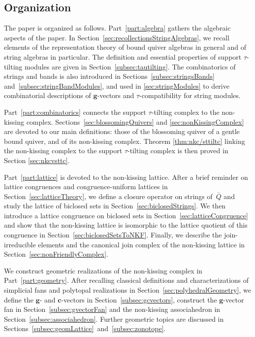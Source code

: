 \documentclass{amsart}
\theoremstyle{definition}
\renewcommand{\b}[1]{\mathbf{#1}} %
\begin{document}
\subsection*{Organization}

The paper is organized as follows.
Part~\ref{part:algebra} gathers the algebraic aspects of the paper.
In Section~\ref{sec:recollectionsStringAlgebras}, we recall elements of the representation theory of bound quiver algebras in general and of string algebras in particular.
The definition and essential properties of support \mbox{$\tau$-tilting} modules are given in Section~\ref{subsec:tautilting}.  
The combinatorics of strings and bands is also introduced in Sections~\ref{subsec:stringsBands} and~\ref{subsec:stringBandModules}, and used in \ref{sec:stringModules} to derive combinatorial descriptions of $\b{g}$-vectors and $\tau$-compatibility for string modules.

Part~\ref{part:combinatorics} connects the support $\tau$-tilting complex to the non-kissing complex.
Sections~\ref{sec:blossomingQuivers} and \ref{sec:nonKissingComplex} are devoted to our main definitions: those of the blossoming quiver of a gentle bound quiver, and of its non-kissing complex.  
Theorem \ref{thm:nkc/sttiltc} linking the non-kissing complex to the support $\tau$-tilting complex is then proved in Section \ref{sec:nkcvsttc}.

Part~\ref{part:lattice} is devoted to the non-kissing lattice.
After a brief reminder on lattice congruences and congruence-uniform lattices in Section~\ref{sec:latticeTheory}, we define a closure operator on strings of~$\bar Q$ and study the lattice of biclosed sets in Section~\ref{sec:biclosedStrings}.
We then introduce a lattice congruence on biclosed sets in Section~\ref{sec:latticeCongruence} and show that the non-kissing lattice is isomorphic to the lattice quotient of this congruence in Section~\ref{sec:biclosedSetsToNKF}.
Finally, we describe the join-irreducible elements and the canonical join complex of the non-kissing lattice in Section~\ref{sec:nonFriendlyComplex}.

We construct geometric realizations of the non-kissing complex in Part~\ref{part:geometry}.
After recalling classical definitions and characterizations of simplicial fans and polytopal realizations in Section~\ref{sec:polyhedralGeometry}, we define the $\b{g}$- and $\b{c}$-vectors in Section~\ref{subsec:gcvectors}, construct the $\b{g}$-vector fan in Section~\ref{subsec:gvectorFan} and the non-kissing associahedron in Section~\ref{subsec:associahedron}.
Further geometric topics are discussed in Sections~\ref{subsec:geomLattice}~and~\ref{subsec:zonotope}.
\end{document}
